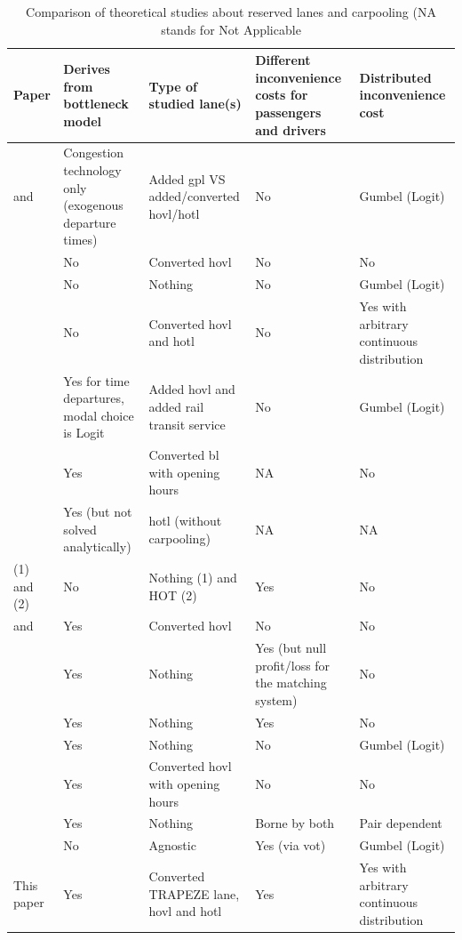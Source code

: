 \documentclass[english, a4paper]{article}
\theoremstyle{plain}
\theoremstyle{definition}
\theoremstyle{remark}
\begin{document}
\begin{table}
    \centering
    \begin{tabular}{|m{}||m{}|m{}|m{}|m{}|}
    \hline
        Paper & Derives from bottleneck model & Type of studied lane(s) & Different inconvenience costs for passengers and drivers & Distributed inconvenience cost\\
        \hline\hline
        \cite{dahlgren_high_1998} and \cite{dahlgren_high-occupancytoll_2002} & Congestion technology only (exogenous departure times) & Added \acrshort{gpl} VS added/converted \acrshort{hovl}/\acrshort{hotl} & No & Gumbel (Logit) \\\hline
        \cite{yang_carpooling_1999} & No & Converted \acrshort{hovl} & No & No \\\hline
        \cite{huang_models_2000} & No & Nothing & No & Gumbel (Logit) \\\hline
        \cite{konishi_carpooling_2010} & No & Converted \acrshort{hovl} and \acrshort{hotl} & No & Yes with arbitrary continuous distribution \\\hline
        \cite{qian_modeling_2011} & Yes for time departures, modal choice is Logit & Added \acrshort{hovl} and added rail transit service & No & Gumbel (Logit) \\\hline
        \cite{gonzales_morning_2012} & Yes & Converted \acrshort{bl} with opening hours & NA & No \\\hline
        \cite{boyles_incorporating_2015} & Yes (but not solved analytically) & \acrshort{hotl} (without carpooling) & NA & NA \\\hline
        \cite{xu_complementarity_2015} (1) and \cite{di_link-node_2018} (2) & No & Nothing (1) and HOT (2) & Yes & No \\\hline
        \cite{xiao_morning_2016} and \cite{xiao_tradable_2021} & Yes & Converted \acrshort{hovl} & No & No \\\hline
        \cite{liu_pricing_2017} & Yes & Nothing & Yes (but null profit/loss for the matching system) & No \\\hline
        \cite{wang_dynamic_2019} & Yes & Nothing & Yes & No \\\hline
        \cite{yu_carpooling_2019} & Yes & Nothing & No & Gumbel (Logit) \\\hline
        \cite{xiao_temporal-spatial_2021} & Yes & Converted \acrshort{hovl} with opening hours & No & No \\\hline
        \cite{de_palma_influence_2022} & Yes & Nothing & Borne by both & Pair dependent\\\hline
        \cite{leurent_what_2024} & No & Agnostic & Yes (via \acrshort{vot}) & Gumbel (Logit) \\\hline
        This paper & Yes & Converted TRAPEZE lane, \acrshort{hovl} and \acrshort{hotl} & Yes & Yes with arbitrary continuous distribution\\\hline
    \end{tabular}
    \caption{Comparison of theoretical studies about reserved lanes and carpooling (NA stands for Not Applicable}
    \label{table:hov_theoretical_studies1}
\end{table}
\end{document}
